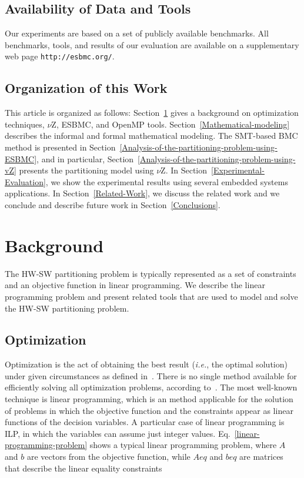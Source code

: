 \documentclass{doublecol-new}
\theoremstyle{TH}{
\newtheorem{lemma}{Lemma}
\newtheorem{theorem}[lemma]{Theorem}
\newtheorem{corrolary}[lemma]{Corrolary}
\newtheorem{conjecture}[lemma]{Conjecture}
\newtheorem{proposition}[lemma]{Proposition}
\newtheorem{claim}[lemma]{Claim}
\newtheorem{stheorem}[lemma]{Wrong Theorem}
\newtheorem{algorithm}{Algorithm}
}
\theoremstyle{THrm}{
\newtheorem{definition}{Definition}[section]
\newtheorem{question}{Question}[section]
\newtheorem{remark}{Remark}
\newtheorem{scheme}{Scheme}
}
\theoremstyle{THhit}{
\newtheorem{case}{Case}[section]
}
\begin{document}
\subsection{Availability of Data and Tools}

Our experiments are based on a set of publicly available benchmarks. All benchmarks, tools, and results of our evaluation are available on a supplementary web page \texttt{http://esbmc.org/}.

\subsection{Organization of this Work}

This article is organized as follows: Section~\ref{background} gives a background on optimization techniques, $\nu$Z, ESBMC, and OpenMP tools. 
Section~\ref{Mathematical-modeling} describes the informal and formal mathematical modeling. The SMT-based BMC method is presented in Section~\ref{Analysis-of-the-partitioning-problem-using-ESBMC}, and in particular, Section~\ref{Analysis-of-the-partitioning-problem-using-vZ} presents the partitioning model using $\nu$Z. In Section~\ref{Experimental-Evaluation}, we show the experimental results using several embedded systems applications. In Section~\ref{Related-Work}, we discuss the related work and we conclude and describe future work in Section~\ref{Conclusions}.

\section{Background}
\label{background}

The HW-SW partitioning problem is typically represented as a set of constraints and an objective function in linear programming. We describe the linear programming problem and present related tools that are used to model and solve the HW-SW partitioning problem.

\subsection{Optimization}
\label{Optimization}

Optimization is the act of obtaining the best result ({\it i.e.}, the optimal solution) under given circumstances as defined in~\cite{Rao2009}. There is no single method available for efficiently solving all optimization problems, according to~\cite{Rao2009}. The most well-known technique is linear programming, which is an method applicable for the solution of problems in which the objective function and the constraints appear as linear functions of the decision variables. A particular case of linear programming is ILP, in which the variables can assume just integer values. Eq.~\eqref{linear-programming-problem} shows a typical linear programming problem, where $A$ and $b$ are vectors from the objective function, while $Aeq$ and $beq$ are matrices that describe the linear equality constraints
\end{document}
